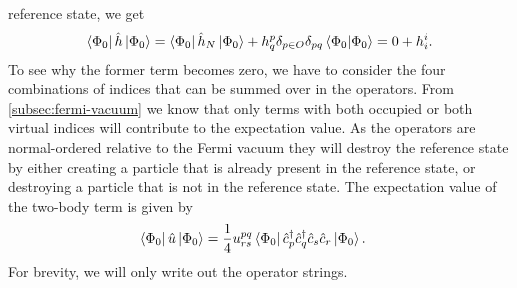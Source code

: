         reference state, we get
        \begin{align}
            \bra{\Phi_{0}}\hat{h}\ket{\Phi_{0}}
            =
            \bra{\Phi_{0}}\hat{h}_N\ket{\Phi_{0}}
            +
            h^{p}_{q}
            \delta_{p \in O}
            \delta_{pq}
            \braket{\Phi_{0}}{\Phi_{0}}
            = 0 + h^{i}_{i}.
        \end{align}
        To see why the former term becomes zero, we have to consider the four
        combinations of indices that can be summed over in the operators.
        From \autoref{subsec:fermi-vacuum} we know that only terms with both
        occupied or both virtual indices will contribute to the expectation
        value.
        As the operators are normal-ordered relative to the Fermi vacuum they
        will destroy the reference state by either creating a particle that is
        already present in the reference state, or destroying a particle that is
        not in the reference state.
        The expectation value of the two-body term is given by
        \begin{align}
            \bra{\Phi_{0}}\hat{u}\ket{\Phi_{0}}
            &=
            \frac{1}{4}u^{pq}_{rs}
            \bra{\Phi_{0}}\hat{c}_{p}^{\dagger}\hat{c}_{q}^{\dagger}\hat{c}_{s}\hat{c}_{r}\ket{\Phi_{0}}.
        \end{align}
        For brevity, we will only write out the operator strings.
